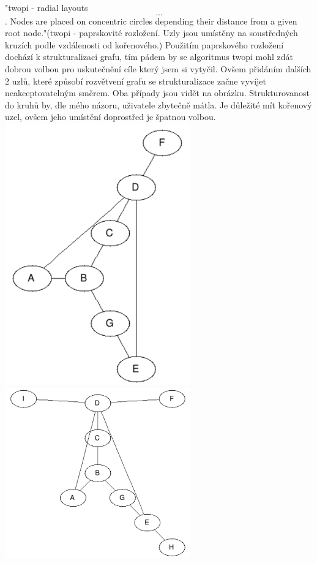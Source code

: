 \documentclass[color,table,oneside,nolot,nolof]{fithesis}
\begin{document}
	"twopi - radial layouts\[...\].  Nodes are placed on concentric circles depending their distance from a given root node."\cite{graphviz_layout}(twopi - paprskovité rozložení. Uzly
	jsou umístěny na soustředných kruzích podle vzdálenosti od kořenového.) Použitím paprskového rozložení dochází k strukturalizaci grafu, tím pádem by se algoritmus twopi mohl zdát 
	dobrou volbou pro uskutečnění cíle který jsem si vytyčil. Ovšem přidáním dalších 2 uzlů, které způsobí rozvětvení grafu se strukturalizace začne vyvíjet neakceptovatelným směrem.
	Oba případy jsou vidět na obrázku. Strukturovanost do kruhů by, dle mého názoru, uživatele zbytečně mátla. Je důležité mít kořenový uzel, ovšem jeho umístění doprostřed je špatnou
	volbou.
	\includegraphics[width=0.6\textwidth]{pictures/twopi_example.png} 
	\includegraphics[width=0.6\textwidth]{pictures/twopi_example_2.png} 
\end{document}
